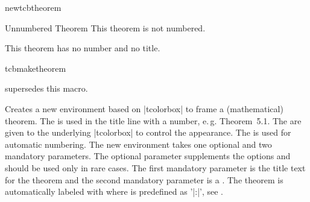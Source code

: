 \begin{docCommand}[doc updated=2016-06-22]{newtcbtheorem}{}
\begin{dispExample}
\begin{mytheo*}{Unnumbered Theorem}
  This theorem is not numbered.
\end{mytheo*}
\end{dispExample}

\begin{dispExample}
\begin{mytheo*}{}
  This theorem has no number and no title.
\end{mytheo*}
\end{dispExample}
\end{docCommand}




\begin{docCommand}{tcbmaketheorem}{}
\smallskip\begin{marker}
 supersedes this macro.
\end{marker}
\begin{deprecated}
  Creates a new environment  based on |tcolorbox| to frame a
  (mathematical) theorem. The  is used in the title line
  with a number, e.\,g. \mbox{\flqq Theorem 5.1\frqq}.
  The  are given to the underlying |tcolorbox| to control
  the appearance.
  The  is used for automatic numbering.
  The new environment  takes one optional and two mandatory
  parameters. The optional parameter supplements the options and should be
  used only in rare cases.
  The first mandatory parameter is the title text for the theorem and
  the second mandatory parameter is a . The theorem is
  automatically labeled with 
  where  is predefined as '|:|', see .
\end{deprecated}
\end{docCommand}

